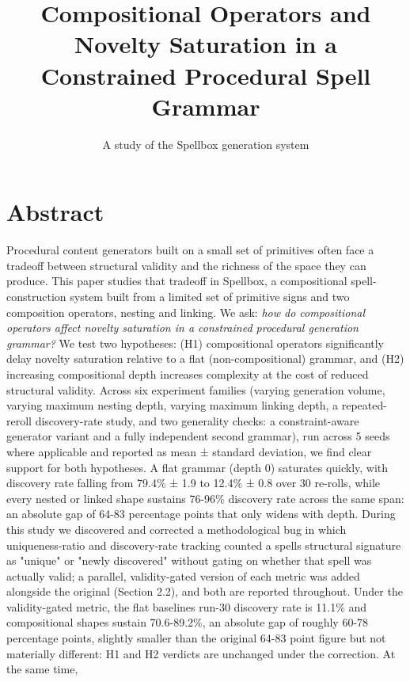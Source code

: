 \documentclass[
  10pt,
  twocolumn]{article}
\title{Compositional Operators and Novelty Saturation in a Constrained
Procedural Spell Grammar}
\subtitle{A study of the Spellbox generation system}
\author{}
\date{}
\begin{document}
\twocolumn[\maketitle]

\section{Abstract}\label{abstract}

Procedural content generators built on a small set of primitives often
face a tradeoff between structural validity and the richness of the
space they can produce. This paper studies that tradeoff in Spellbox, a
compositional spell-construction system built from a limited set of
primitive signs and two composition operators, nesting and linking. We
ask: \emph{how do compositional operators affect novelty saturation in a
constrained procedural generation grammar?} We test two hypotheses: (H1)
compositional operators significantly delay novelty saturation relative
to a flat (non-compositional) grammar, and (H2) increasing compositional
depth increases complexity at the cost of reduced structural validity.
Across six experiment families (varying generation volume, varying
maximum nesting depth, varying maximum linking depth, a repeated-reroll
discovery-rate study, and two generality checks: a constraint-aware
generator variant and a fully independent second grammar), run across 5
seeds where applicable and reported as mean ± standard deviation, we
find clear support for both hypotheses. A flat grammar (depth 0)
saturates quickly, with discovery rate falling from 79.4\% ± 1.9 to
12.4\% ± 0.8 over 30 re-rolls, while every nested or linked shape
sustains 76-96\% discovery rate across the same span: an absolute gap of
64-83 percentage points that only widens with depth. During this study
we discovered and corrected a methodological bug in which
uniqueness-ratio and discovery-rate tracking counted a
spell\textquotesingle s structural signature as "unique" or "newly
discovered" without gating on whether that spell was actually valid; a
parallel, validity-gated version of each metric was added alongside the
original (Section 2.2), and both are reported throughout. Under the
validity-gated metric, the flat baseline\textquotesingle s run-30
discovery rate is 11.1\% and compositional shapes sustain 70.6-89.2\%,
an absolute gap of roughly 60-78 percentage points, slightly smaller
than the original 64-83 point figure but not materially different: H1
and H2 verdicts are unchanged under the correction. At the same time,
\end{document}
